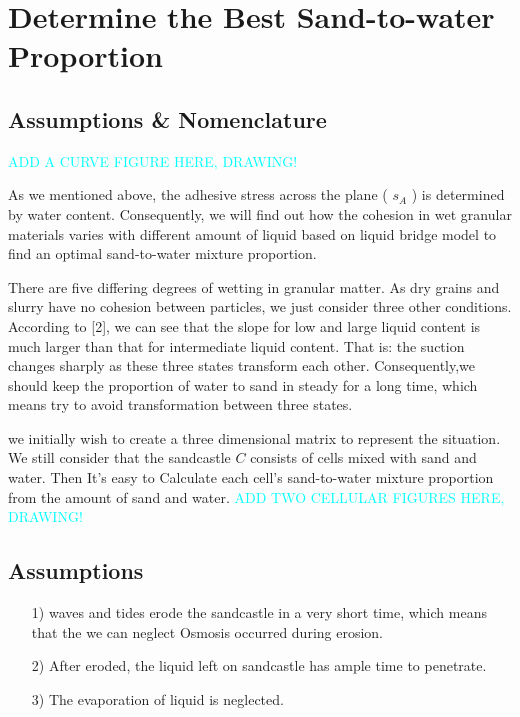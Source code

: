 \documentclass[12pt]{article}
\begin{document}
\section{Determine the Best Sand-to-water Proportion}
\subsection{Assumptions \& Nomenclature}
\textcolor{cyan}{ADD A CURVE FIGURE HERE, DRAWING!}
\par
As we mentioned above, the adhesive stress across the plane ( $s_A$ ) is determined by water content. Consequently, we will find out how the cohesion in wet granular materials varies with different amount of liquid based on liquid bridge model to find an optimal sand-to-water mixture proportion.
\par
There are five differing degrees of wetting in granular matter. As dry grains and slurry have no cohesion between particles, we just consider three other conditions. According to [2], we can see that the slope for low and large liquid content is much larger than that for intermediate liquid content. That is: the suction changes sharply as these three states transform each other. Consequently,we should keep the proportion of water to sand in steady for a long time, which means try to avoid transformation between three states.
\par
we initially wish to create a three dimensional matrix to represent the situation. We still consider that the sandcastle $C$ consists of cells mixed with sand and water. Then It's easy to Calculate each cell’s sand-to-water mixture proportion from the amount of sand and water.
\textcolor{cyan}{ADD TWO CELLULAR FIGURES HERE, DRAWING!}
\subsection{Assumptions}
\begin{itemize}
    \item [1)]
          waves and tides erode the sandcastle in a very short time, which means that the we can neglect Osmosis occurred during erosion.
    \item [2)]
          After eroded, the liquid left on sandcastle has ample time to penetrate.
    \item [3)]
          The evaporation of liquid is neglected.
\end{itemize}
\end{document}

